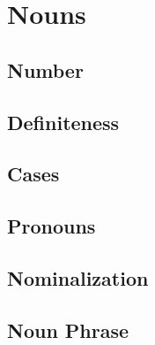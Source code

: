 \chapter{Nouns}
	\section{Number}
	\section{Definiteness}
	\section{Cases}
	\section{Pronouns}
	\section{Nominalization}
	\section{Noun Phrase}
